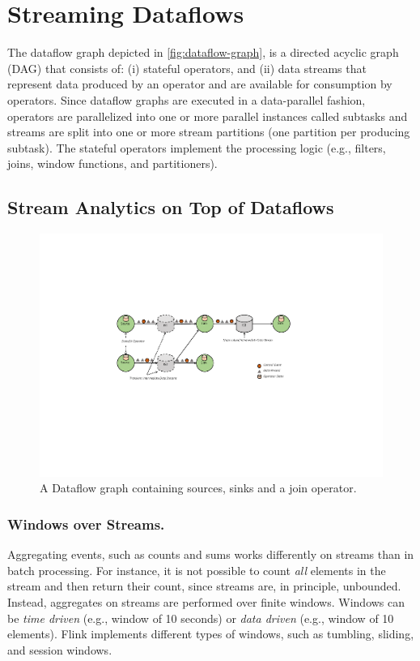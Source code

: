 \documentclass{llncs}
\begin{document}
\section{Streaming Dataflows}
\label{sec:dataflows}
The  dataflow  graph  depicted  in  \autoref{fig:dataflow-graph},  is  a  directed  acyclic  graph  (DAG)  that  consists  of:  (i)  stateful operators, and (ii) data streams that represent data produced by an operator and are available for consumption by operators. Since dataflow graphs are executed in a data-parallel fashion, operators are parallelized into one or more parallel instances called subtasks and streams are split into one or more stream partitions (one partition per producing subtask). The stateful operators implement the processing logic (e.g., filters, joins, window functions, and partitioners). 

\subsection{Stream Analytics on Top of Dataflows}
\begin{figure}[t!]
\centering
\includegraphics[width=.95\textwidth]{dataflow}
\caption{A Dataflow graph containing sources, sinks and a join operator.}
\label{fig:dataflow-graph}
\end{figure}

\subsubsection{Windows over Streams.}
Aggregating events, such as counts and sums works differently on streams than in batch processing. For instance, it is not possible to count \textit{all} elements in the stream and then return their count, since streams are, in principle, unbounded. Instead, aggregates on streams are performed over finite windows. Windows can be \textit{time driven} (e.g., window of 10 seconds) or \textit{data driven} (e.g., window of 10 elements). Flink implements different types of windows, such as tumbling, sliding, and session windows.
\end{document}
